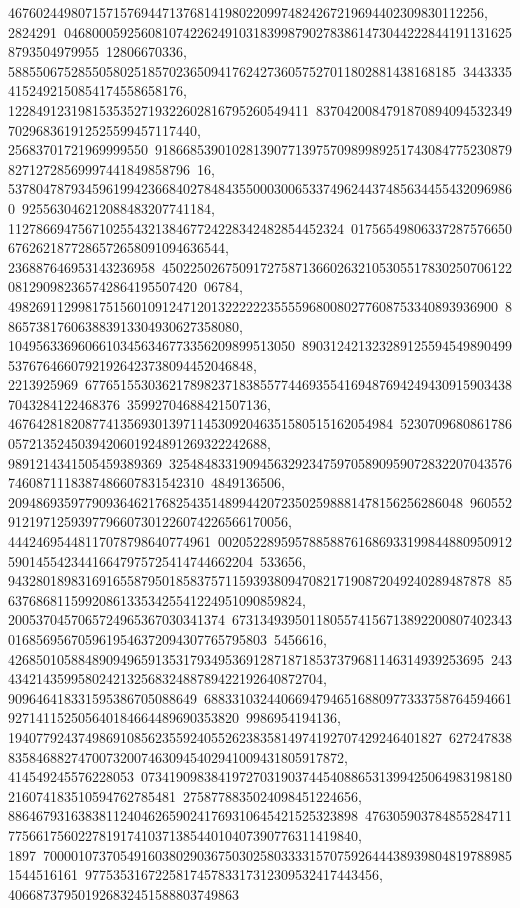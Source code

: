 {{{46760244980715715769447137681419802209974824267219694402309830112256, 2824291\
04680005925608107422624910318399879027838614730442228441911316258793504979955\
12806670336, 5885506752855058025185702365094176242736057527011802881438168185\
34433354152492150854174558658176, 1228491231981535352719322602816795260549411\
8370420084791870894094532349702968361912525599457117440, 25683701721969999550\
91866853901028139077139757098998925174308477523087982712728569997441849858796\
16, 5378047879345961994236684027848435500030065337496244374856344554320969860\
925563046212088483207741184, 112786694756710255432138467724228342482854452324\
017565498063372875766506762621877286572658091094636544, 236887646953143236958\
45022502675091727587136602632105305517830250706122081290982365742864195507420\
06784, 4982691129981751560109124712013222222355559680080277608753340893936900\
8865738176063883913304930627358080, 10495633696066103456346773356209899513050\
89031242132328912559454989049953767646607921926423738094452046848, 2213925969\
67765155303621789823718385577446935541694876942494309159034387043284122468376\
35992704688421507136, 4676428182087741356930139711453092046351580515162054984\
52307096808617860572135245039420601924891269322242688, 9891214341505459389369\
32548483319094563292347597058909590728322070435767460871118387486607831542310\
4849136506, 20948693597790936462176825435148994420723502598881478156256286048\
9605529121971259397796607301226074226566170056, 44424695448117078798640774961\
00205228959578858876168693319984488095091259014554234416647975725414744662204\
533656, 943280189831691655879501858375711593938094708217190872049240289487878\
85637686811599208613353425541224951090859824, 2005370457065724965367030341374\
67313493950118055741567138922008074023430168569567059619546372094307765795803\
5456616, 42685010588489094965913531793495369128718718537379681146314939253695\
243434214359958024213256832488789422192640872704, 909646418331595386705088649\
68833103244066947946516880977333758764594661927141152505640184664489690353820\
9986954194136, 19407792437498691085623559240552623835814974192707429246401827\
627247838835846882747007320074630945402941009431805917872, 414549245576228053\
07341909838419727031903744540886531399425064983198180216074183510594762785481\
2758778835024098451224656, 88646793163838112404626590241769310645421525323898\
47630590378485528471177566175602278191741037138544010407390776311419840, 1897\
70000107370549160380290367503025803333157075926444389398048197889851544516161\
977535316722581745783317312309532417443456, 406687379501926832451588803749863\
}}}
